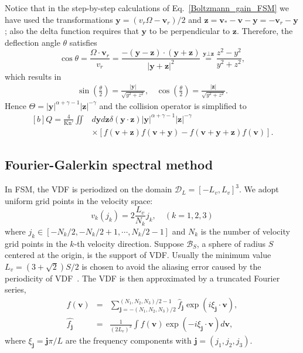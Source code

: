Notice that in the step-by-step calculations of Eq.~\eqref{Boltzmann_gain_FSM} we have used the transformations $\bm{y}=(v_r\Omega-\bm{v}_r)/2$ and $\bm{z}=\bm{v}_\ast-\bm{v}-\bm{y}=-\bm{v}_r-\bm{y}$; also the delta function requires that $\bm{y}$ to be perpendicular to $\bm{z}$. Therefore, the deflection angle $\theta$ satisfies 
\begin{equation}
    \cos\theta=\frac{\Omega\cdot{\bm{v}_r}}{v_r}
    =\frac{-(\bm{y}-\bm{z})\cdot(\bm{y}+\bm{z})}{|\bm{y}+\bm{z}|^2}
    \overset{\bm{y}\bot{\bm{z}}}
    {=}\frac{z^2-y^2}{y^2+z^2},
\end{equation}
which results in
\begin{equation}\label{sincos}
\begin{aligned}
\sin\left(\frac{\theta}{2}\right)=\frac{|\bm{y}|}{\sqrt{y^2+z^2}},\ \ \ \ 
\cos\left(\frac{\theta}{2}\right)=\frac{|\bm{z}|}{\sqrt{y^2+z^2}}.
\end{aligned}
\end{equation}
Hence
$\Theta=|\bm{y}|^{\alpha+\gamma-1}|\bm{z}|^{-\gamma}$ and the collision
operator is simplified to
\begin{equation}\label{ccc}
\begin{aligned}[b]
 Q=\frac{4}{\text{Kn}'}\iint&d\bm{y} d\bm{z}\delta(\bm{y}\cdot{}\bm{z})|\bm{y}|^{\alpha+\gamma-1}|\bm{z}|^{-\gamma}\\
 &\times [f(\bm{v}+\bm{z})f(\bm{v}+\bm{y})-f(\bm{v}+\bm{y}+\bm{z})f(\bm{v})].
 \end{aligned}
\end{equation}


\subsection{Fourier-Galerkin spectral method}\label{fourier_galerkin_spectral}

In FSM, the VDF is periodized on the domain $\mathcal{D}_L=[-L_v,L_v]^3$. We adopt uniform grid points in the velocity space:
\begin{equation}
v_k(j_k)=2\frac{L_v}{N_k}j_k, \quad (k=1,2,3)
\end{equation}
where $j_k\in[-N_k/2, -N_k/2+1,\cdots, N_k/2-1]$ and $N_k$ is the number of velocity grid points in the $k$-th velocity direction. Suppose $\mathcal{B}_S$, a sphere of radius $S$ centered at the origin, is the support of VDF. Usually the minimum value 
$L_v=(3+\sqrt2)S/2$ is chosen to avoid the aliasing error caused by the periodicity of VDF~\cite{Pareschi2000}. The VDF is then approximated by a truncated Fourier series,
\begin{eqnarray}
    f(\bm{v})&=&\sum_{\bm{j}=-(N_1,N_2,N_3)/2}^{(N_1,N_2,N_3)/2-1}
    \hat{f}_{\bm{j}}\exp(i\xi_{\bm{j}}\cdot{}\bm{v}), \label{fourier}\\
    \hat{f_{\bm{j}}}&=&\frac{1}{(2L_v)^3}
    \int{}f(\bm{v})\exp(-i\xi_{\bm{j}}\cdot{}\bm{v})d\bm{v},
    \label{inverse_FSM_fourier}
\end{eqnarray}
where $\xi_{\bm{j}}=\bm{j}\pi/L$ are the frequency components with $\bm{j}=(j_1,j_2,j_3)$. 


